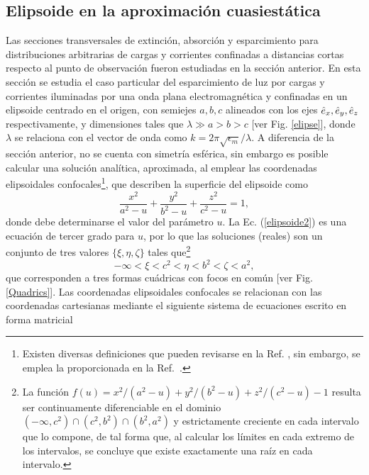 \hypertarget{elipsoide}{\subsection{Elipsoide en la aproximación cuasiestática}}
Las secciones transversales de extinción, absorción y esparcimiento para distribuciones arbitrarias de cargas y corrientes confinadas a distancias cortas respecto al punto de observación fueron estudiadas en la sección anterior. En esta sección se estudia el caso particular del esparcimiento de luz por cargas y corrientes iluminadas por una onda plana electromagnética y confinadas en un elipsoide centrado en el origen, con semiejes $a,b,c$ alineados con los ejes $\hat{e}_{x},\hat{e}_{y},\hat{e}_{z}$ respectivamente, y dimensiones tales que $\lambda\gg a>b>c$ [ver Fig. \ref{elipse}], donde $\lambda$ se relaciona con el vector de onda como $k=2\pi\sqrt{\epsilon_m}/\lambda$. A diferencia de la sección anterior, no se cuenta con simetría esférica, sin embargo es posible calcular una solución analítica, aproximada, al emplear las coordenadas elipsoidales confocales\footnote{Existen diversas definiciones que pueden revisarse en la Ref. \cite{ConfocalEllip}, sin embargo, se emplea la proporcionada en la Ref.~\cite{Arfken}. }, que describen la superficie del elipsoide como \cite{ConfocalEllip}
\begin{equation}
	\frac{x^2}{a^2-u}+\frac{y^2}{b^2-u}+\frac{z^2}{c^2-u}=1,
	\label{elipsoide2}
\end{equation}
 donde debe determinarse el valor del parámetro $u$. La Ec. (\ref{elipsoide2}) es una ecuación de tercer grado para $u$, por lo que las soluciones (reales) son un conjunto de tres valores $\{\xi,\eta,\zeta\}$ tales que\footnote{La función $f(u)=x^2/(a^2-u)+y^2/(b^2-u)+z^2/(c^2-u)-1$ resulta ser continuamente diferenciable en el dominio $(-\infty, c^2)\cap (c^2, b^2)\cap (b^2, a^2)$ y estrictamente creciente en cada intervalo que lo compone, de tal forma que, al calcular los límites en cada extremo de los intervalos, se concluye que existe exactamente una raíz en cada intervalo.}
\begin{equation}
	-\infty<\xi<c^2<\eta<b^2<\zeta<a^2,
\end{equation}
que corresponden a tres formas cuádricas con focos en común [ver Fig. \ref{Quadrics}]. Las coordenadas elipsoidales confocales se relacionan con las coordenadas cartesianas mediante el siguiente sistema de ecuaciones escrito en forma matricial
%
